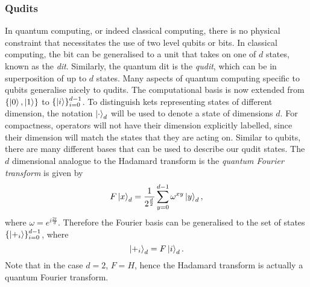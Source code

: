 \subsubsection{Qudits}
\label{subsubsection:qudits}
In quantum computing, or indeed classical computing, there is no physical constraint that necessitates the use of two level qubits or bits.
In classical computing, the bit can be generalised to a unit that takes on one of $d$ states, known as the \emph{dit}.
Similarly, the quantum dit is the \emph{qudit}, which can be in superposition of up to $d$ states.
Many aspects of quantum computing specific to qubits generalise nicely to qudits.
The computational basis is now extended from $\{\ket{0}, \ket{1}\}$ to $\{\ket{i}\}_{i=0}^{d-1}$.
To distinguish kets representing states of different dimension, the notation $\ket{\cdot}_d$ will be used to denote a state of dimensions $d$.
For compactness, operators will not have their dimension explicitly labelled, since their dimension will match the states that they are acting on.
Similar to qubits, there are many different bases that can be used to describe our qudit states.
The $d$ dimensional analogue to the Hadamard transform is the \emph{quantum Fourier transform} is given by
\begin{equation}
    F\ket{x}_d = \frac{1}{2^{\frac{d}{2}}} \sum_{y=0}^{d-1} \omega^{xy}\ket{y}_d,
\end{equation}
where $\omega = e^{i\frac{2\pi}{d}}$.
Therefore the Fourier basis can be generalised to the set of states  $\{\ket{+_i}\}_{i=0}^{d-1}$, where
\begin{equation}
    \ket{+_i}_d = F\ket{i}_d.
\end{equation}
Note that in the case $d=2$, $F = H$, hence the Hadamard transform is actually a quantum Fourier transform.

